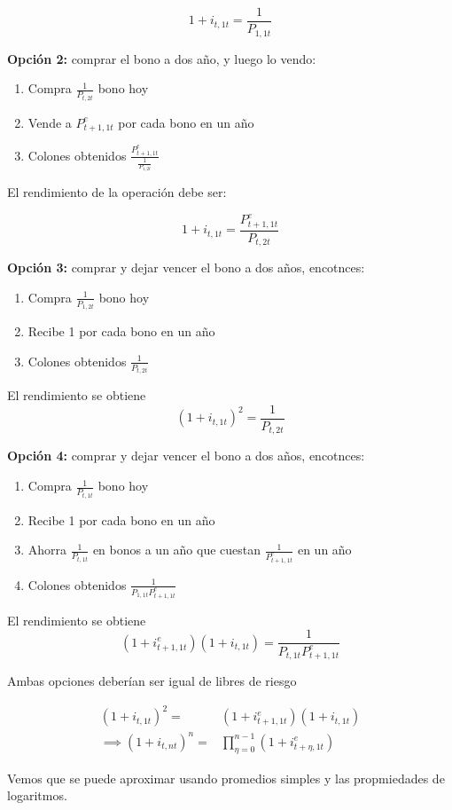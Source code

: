 $$1+i_{t,1t}=\frac{1}{P_{1,1t}}$$

\textbf{Opción 2:} comprar el bono a dos año, y luego lo vendo:
\begin{enumerate}
    \item Compra $\frac{1}{P_{t,2t}}$ bono hoy
    \item Vende a $P_{t+1,1t}^{e}$ por cada bono en un año
    \item Colones obtenidos $\frac{P_{t+1,1t}^{e}}{\frac{1}{P_{1,2t}}}$
\end{enumerate}

El rendimiento de la operación debe ser:

$$1+i_{t,1t}=\frac{P_{t+1,1t}^{e}}{P_{t,2t}}$$

\textbf{Opción 3:} comprar y dejar vencer el bono a dos años, encotnces:
\begin{enumerate}
    \item Compra $\frac{1}{P_{1,2t}}$ bono hoy
    \item Recibe 1 por cada bono en un año
    \item Colones obtenidos $\frac{1}{P_{t,2t}}$
\end{enumerate}

El rendimiento se obtiene 
$$(1+i_{t,1t})^{2}=\frac{1}{P_{t,2t}}$$

\textbf{Opción 4:} comprar y dejar vencer el bono a dos años, encotnces:
\begin{enumerate}
    \item Compra $\frac{1}{P_{t,1t}}$ bono hoy
    \item Recibe 1 por cada bono en un año
    \item Ahorra $\frac{1}{P_{t,1t}}$ en bonos a un año que cuestan $\frac{1}{P_{t+1,1t}^{e}}$ en un año
    \item Colones obtenidos $\frac{1}{P_{1,1t}P_{t+1,1t}^{e}}$
\end{enumerate}

El rendimiento se obtiene 
$$(1+i^{e}_{t+1,1t})(1+i_{t,1t})=\frac{1}{P_{t,1t}P_{t+1,1t}^{e}}$$

Ambas opciones deberían ser igual de libres de riesgo

\begin{align}
    (1+i_{t,1t})^{2} =& (1+i^{e}_{t+1,1t})(1+i_{t,1t})\\
    \implies (1+i_{t,nt})^{n}  =& \prod_{\eta=0}^{n-1} (1+i^{e}_{t+\eta,1t})
\end{align}

Vemos que se puede aproximar usando promedios simples y las propmiedades de logaritmos.

